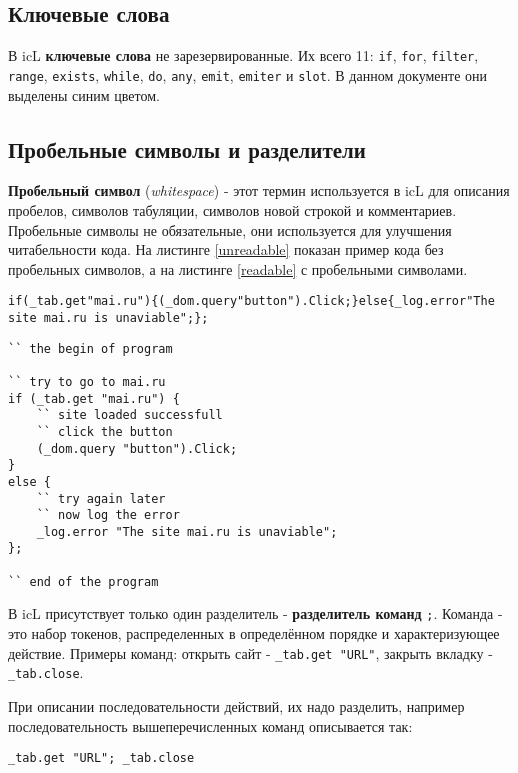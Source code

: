 \documentclass[a4paper, 14pt]{extarticle}
\begin{document}
\subsection{Ключевые слова}
	
	В icL \textbf{ключевые слова} не зарезервированные. Их всего 11: \lstinline`if`, \lstinline`for`, \lstinline`filter`, \lstinline`range`, \lstinline`exists`, \lstinline`while`, \lstinline`do`, \lstinline`any`, \lstinline`emit`, \lstinline`emiter` и \lstinline`slot`. В данном документе они выделены синим цветом.
  
\subsection{Пробельные символы и разделители}
	
	\textbf{Пробельный символ} (\textit{whitespace}) - этот термин используется в icL для описания пробелов, символов табуляции, символов новой строкой и комментариев. Пробельные символы не обязательные, они используется для улучшения читабельности кода. На листинге \ref{unreadable} показан пример кода без пробельных символов, а на листинге \ref{readable} с пробельными символами.
	
\begin{lstlisting}[caption=Koд без пробельных символов,label=unreadable]
if(_tab.get"mai.ru"){(_dom.query"button").Click;}else{_log.error"The site mai.ru is unaviable";};
\end{lstlisting}
	
\begin{lstlisting}[caption=Koд с пробельных символов,label=readable]
`` the begin of program

`` try to go to mai.ru
if (_tab.get "mai.ru") {
	`` site loaded successfull
	`` click the button
	(_dom.query "button").Click;
}
else {
	`` try again later
	`` now log the error
	_log.error "The site mai.ru is unaviable";
};

`` end of the program
\end{lstlisting}
	
	В icL присутствует только один разделитель - \textbf{разделитель команд} \lstinline`;`. Команда - это набор токенов, распределенных в определённом порядке и характеризующее действие. Примеры команд: открыть сайт - \lstinline`_tab.get "URL"`, закрыть вкладку - \lstinline`_tab.close`.
	
	При описании последовательности действий, их надо разделить, например последовательность вышеперечисленных команд описывается так:	
\begin{lstlisting}[numbers=none]
_tab.get "URL"; _tab.close
\end{lstlisting} 
	
\end{document}
